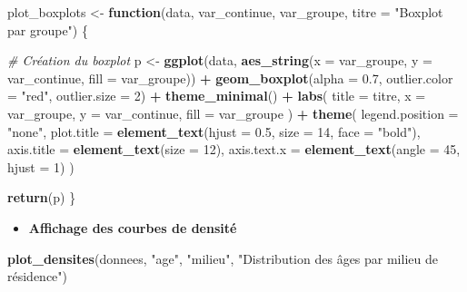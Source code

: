\documentclass[
  12pt,
]{article}
\newenvironment{Shaded}{\begin{snugshade}}{\end{snugshade}}
\newcommand{\AttributeTok}[1]{\textcolor[rgb]{0.13,0.29,0.53}{#1}}
\newcommand{\CommentTok}[1]{\textcolor[rgb]{0.56,0.35,0.01}{\textit{#1}}}
\newcommand{\ControlFlowTok}[1]{\textcolor[rgb]{0.13,0.29,0.53}{\textbf{#1}}}
\newcommand{\DecValTok}[1]{\textcolor[rgb]{0.00,0.00,0.81}{#1}}
\newcommand{\FloatTok}[1]{\textcolor[rgb]{0.00,0.00,0.81}{#1}}
\newcommand{\FunctionTok}[1]{\textcolor[rgb]{0.13,0.29,0.53}{\textbf{#1}}}
\newcommand{\NormalTok}[1]{#1}
\newcommand{\OtherTok}[1]{\textcolor[rgb]{0.56,0.35,0.01}{#1}}
\newcommand{\SpecialCharTok}[1]{\textcolor[rgb]{0.81,0.36,0.00}{\textbf{#1}}}
\newcommand{\StringTok}[1]{\textcolor[rgb]{0.31,0.60,0.02}{#1}}
\providecommand{\tightlist}{%
  \setlength{\itemsep}{0pt}\setlength{\parskip}{0pt}}
\begin{document}
\begin{Shaded}
\begin{Highlighting}[]
\NormalTok{plot\_boxplots }\OtherTok{\textless{}{-}} \ControlFlowTok{function}\NormalTok{(data, var\_continue, var\_groupe, }
                          \AttributeTok{titre =} \StringTok{"Boxplot par groupe"}\NormalTok{) \{}
  
  \CommentTok{\# Création du boxplot}
\NormalTok{  p }\OtherTok{\textless{}{-}} \FunctionTok{ggplot}\NormalTok{(data, }\FunctionTok{aes\_string}\NormalTok{(}\AttributeTok{x =}\NormalTok{ var\_groupe, }\AttributeTok{y =}\NormalTok{ var\_continue, }\AttributeTok{fill =}\NormalTok{ var\_groupe)) }\SpecialCharTok{+}
    \FunctionTok{geom\_boxplot}\NormalTok{(}\AttributeTok{alpha =} \FloatTok{0.7}\NormalTok{, }\AttributeTok{outlier.color =} \StringTok{"red"}\NormalTok{, }\AttributeTok{outlier.size =} \DecValTok{2}\NormalTok{) }\SpecialCharTok{+}
    \FunctionTok{theme\_minimal}\NormalTok{() }\SpecialCharTok{+}
    \FunctionTok{labs}\NormalTok{(}
      \AttributeTok{title =}\NormalTok{ titre,}
      \AttributeTok{x =}\NormalTok{ var\_groupe,}
      \AttributeTok{y =}\NormalTok{ var\_continue,}
      \AttributeTok{fill =}\NormalTok{ var\_groupe}
\NormalTok{    ) }\SpecialCharTok{+}
    \FunctionTok{theme}\NormalTok{(}
      \AttributeTok{legend.position =} \StringTok{"none"}\NormalTok{,}
      \AttributeTok{plot.title =} \FunctionTok{element\_text}\NormalTok{(}\AttributeTok{hjust =} \FloatTok{0.5}\NormalTok{, }\AttributeTok{size =} \DecValTok{14}\NormalTok{, }\AttributeTok{face =} \StringTok{"bold"}\NormalTok{),}
      \AttributeTok{axis.title =} \FunctionTok{element\_text}\NormalTok{(}\AttributeTok{size =} \DecValTok{12}\NormalTok{),}
      \AttributeTok{axis.text.x =} \FunctionTok{element\_text}\NormalTok{(}\AttributeTok{angle =} \DecValTok{45}\NormalTok{, }\AttributeTok{hjust =} \DecValTok{1}\NormalTok{)}
\NormalTok{    )}
  
  \FunctionTok{return}\NormalTok{(p)}
\NormalTok{\}}
\end{Highlighting}
\end{Shaded}

\begin{itemize}
\tightlist
\item
  \textbf{Affichage des courbes de densité}
\end{itemize}

\begin{Shaded}
\begin{Highlighting}[]
\FunctionTok{plot\_densites}\NormalTok{(donnees, }\StringTok{"age"}\NormalTok{, }\StringTok{"milieu"}\NormalTok{, }\StringTok{"Distribution des âges par milieu de résidence"}\NormalTok{)}
\end{Highlighting}
\end{Shaded}
\end{document}
